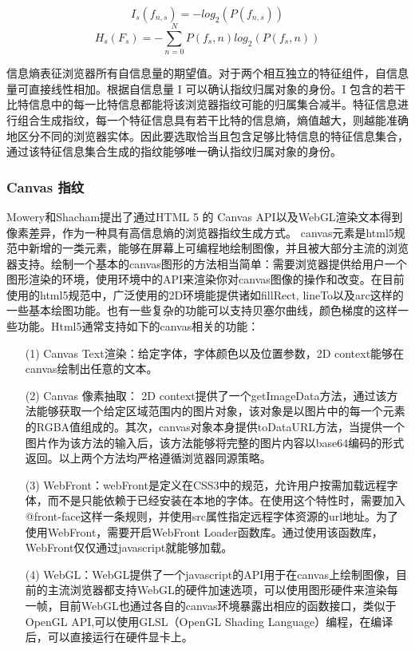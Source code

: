 \documentclass[doctor,privacy,twoside]{buaa_mac}
\begin{document}
\begin{equation}
I_s(f_{n,s})=-log_2(P(f_{n,s})) 
\end{equation}
\begin{equation}
H_s(F_s)=-\sum_{n=0}^{N}P(f_s,n)log_2(P(f_s,n)) 
\end{equation}


信息熵表征浏览器所有自信息量的期望值。对于两个相互独立的特征组件，自信息量可直接线性相加。根据自信息量 I 可以确认指纹归属对象的身份。I 包含的若干比特信息中的每一比特信息都能将该浏览器指纹可能的归属集合减半。特征信息进行组合生成指纹，每一个特征信息具有若干比特的信息熵，熵值越大，则越能准确地区分不同的浏览器实体。因此要选取恰当且包含足够比特信息的特征信息集合，通过该特征信息集合生成的指纹能够唯一确认指纹归属对象的身份。



\subsubsection{Canvas 指纹}
Mowery和Shacham提出了通过HTML 5 的 Canvas API以及WebGL渲染文本得到像素差异，作为一种具有高信息熵的浏览器指纹生成方式。
canvas元素是html5规范中新增的一类元素，能够在屏幕上可编程地绘制图像，并且被大部分主流的浏览器支持。绘制一个基本的canvas图形的方法相当简单：需要浏览器提供给用户一个图形渲染的环境，使用环境中的API来渲染你对canvas图像的操作和改变。在目前使用的html5规范中，广泛使用的2D环境能提供诸如fillRect, lineTo以及arc这样的一些基本绘图功能。也有一些复杂的功能可以支持贝塞尔曲线，颜色梯度的这样一些功能。Html5通常支持如下的canvas相关的功能：

\begin{itemize}
\item[(1)] Canvas Text渲染：给定字体，字体颜色以及位置参数，2D context能够在canvas绘制出任意的文本。
\item[(2)] Canvas 像素抽取： 2D context提供了一个getImageData方法，通过该方法能够获取一个给定区域范围内的图片对象，该对象是以图片中的每一个元素的RGBA值组成的。其次，canvas对象本身提供toDataURL方法，当提供一个图片作为该方法的输入后，该方法能够将完整的图片内容以base64编码的形式返回。以上两个方法均严格遵循浏览器同源策略。
\item[(3)] WebFront：webFront是定义在CSS3中的规范，允许用户按需加载远程字体，而不是只能依赖于已经安装在本地的字体。在使用这个特性时，需要加入@front-face这样一条规则，并使用src属性指定远程字体资源的url地址。为了使用WebFront，需要开启WebFront Loader函数库。通过使用该函数库，WebFront仅仅通过javascript就能够加载。
 \item[(4)] WebGL：WebGL提供了一个javascript的API用于在canvas上绘制图像，目前的主流浏览器都支持WebGL的硬件加速选项，可以使用图形硬件来渲染每一帧，目前WebGL也通过各自的canvas环境暴露出相应的函数接口，类似于OpenGL API,可以使用GLSL（OpenGL Shading Language）编程，在编译后，可以直接运行在硬件显卡上。
 \end{itemize}
\end{document}
